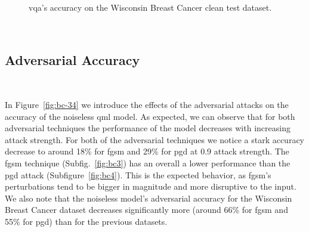 \begin{figure}[!h]
  \caption{\ac{vqa}'s accuracy on the Wisconsin Breast Cancer clean test dataset.}
  \label{fig:bc-12}
\end{figure} \

\subsection{Adversarial Accuracy}\label{subsection:breast-cancer-adv-acc} \

In Figure~\ref{fig:bc-34} we introduce the effects of the
adversarial attacks on the accuracy of the noiseless \ac{qml}
model. As expected, we can observe that for both adversarial
techniques the performance of the model decreases with increasing
attack strength. For both of the adversarial techniques
we notice a stark accuracy decrease to around 18\% for \ac{fgsm}
and 29\% for \ac{pgd} at 0.9 attack strength. The \ac{fgsm} technique
(Subfig.~\ref{fig:bc3}) has an overall a lower performance than the
\ac{pgd} attack (Subfigure~\ref{fig:bc4}). This is the expected
behavior, as \ac{fgsm}'s perturbations tend to be bigger in
magnitude and more disruptive to the input. We also note that the
noiseless model's adversarial accuracy for the Wisconsin Breast
Cancer dataset decreases significantly more (around 66\% for
\ac{fgsm} and 55\% for \ac{pgd}) than for the previous datasets. \

